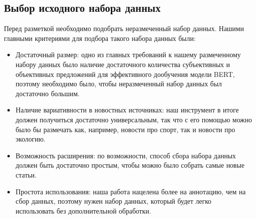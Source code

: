 \documentclass[a4paper,14pt]{extarticle}
\begin{document}
    \subsection{Выбор исходного набора данных}
    Перед разметкой необходимо подобрать неразмеченный набор данных. Нашими главными критериями для подбора такого набора данных были: 
    \begin{itemize}
        \item Достаточный размер: одно из главных требований к нашему размеченному набору данных было наличие достаточного количества субъективных и объективных предложений для эффективного дообучения модели BERT, поэтому необходимо было, чтобы неразмеченный набор данных был достаточно большим.
        \item Наличие вариативности в новостных источниках: наш инструмент в итоге должен получиться достаточно универсальным, так что с его помощью можно было бы размечать как, например, новости про спорт, так и новости про экологию.
        \item Возможность расширения: по возможности, способ сбора набора данных должен быть достаточно простым, чтобы можно было собрать самые новые статьи.
        \item Простота использования: наша работа нацелена более на аннотацию, чем на сбор данных, поэтому нужен набор данных, который будет легко использовать без дополнительной обработки.
    \end{itemize}
    
\end{document}
